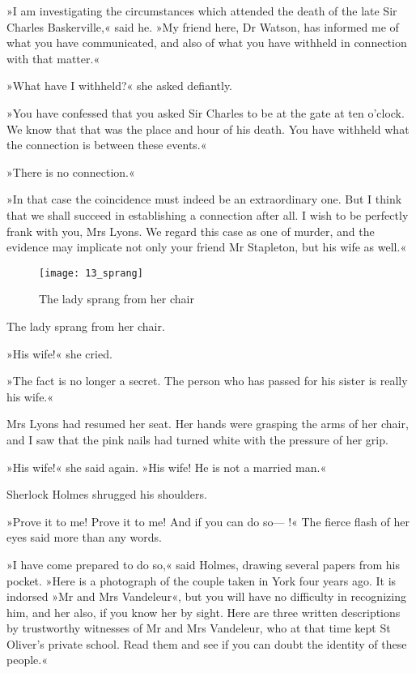 »I am investigating the circumstances which attended the death of the late Sir Charles Baskerville,« said he. »My friend here, Dr Watson, has informed me of what you have communicated, and also of what you have withheld in connection with that matter.«

»What have I withheld?« she asked defiantly.

»You have confessed that you asked Sir Charles to be at the gate at ten o'clock. We know that that was the place and hour of his death. You have withheld what the connection is between these events.«

»There is no connection.«

»In that case the coincidence must indeed be an extraordinary one. But I think that we shall succeed in establishing a connection after all. I wish to be perfectly frank with you, Mrs Lyons. We regard this case as one of murder, and the evidence may implicate not only your friend Mr Stapleton, but his wife as well.«

\begin{figure}[tbh]
\centering
\texttt{[image: 13\_sprang]}
\caption{The lady sprang from her chair}
\end{figure}

The lady sprang from her chair.

»His wife!« she cried.

»The fact is no longer a secret. The person who has passed for his sister is really his wife.«

Mrs Lyons had resumed her seat. Her hands were grasping the arms of her chair, and I saw that the pink nails had turned white with the pressure of her grip.

»His wife!« she said again. »His wife! He is not a married man.«

Sherlock Holmes shrugged his shoulders.

»Prove it to me! Prove it to me! And if you can do so— !« The fierce flash of her eyes said more than any words.

»I have come prepared to do so,« said Holmes, drawing several papers from his pocket. »Here is a photograph of the couple taken in York four years ago. It is indorsed »Mr and Mrs Vandeleur«, but you will have no difficulty in recognizing him, and her also, if you know her by sight. Here are three written descriptions by trustworthy witnesses of Mr and Mrs Vandeleur, who at that time kept St Oliver's private school. Read them and see if you can doubt the identity of these people.«

